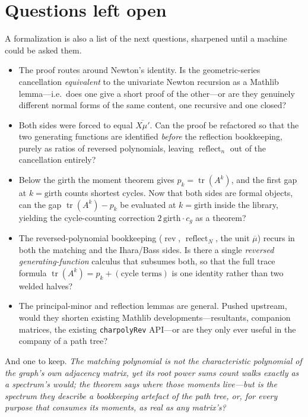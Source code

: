\documentclass[11pt]{article}
\newcommand{\lean}[1]{{\def\_{\textunderscore\allowbreak}\texttt{#1}}}
\DeclareMathOperator{\tr}{tr}
\DeclareMathOperator{\reflect}{reflect}
\DeclareMathOperator{\rev}{rev}
\begin{document}
\section{Questions left open}
\label{sec:questions}

A formalization is also a list of the next questions, sharpened until a machine could be asked them.

\begin{itemize}
\item The proof routes around Newton's identity. Is the geometric-series cancellation
\emph{equivalent} to the univariate Newton recursion as a Mathlib lemma---i.e.\ does one give a
short proof of the other---or are they genuinely different normal forms of the same content, one
recursive and one closed?
\item Both sides were forced to equal $\overline{X\mu'}$. Can the proof be refactored so that the two
generating functions are identified \emph{before} the reflection bookkeeping, purely as ratios of
reversed polynomials, leaving $\reflect_n$ out of the cancellation entirely?
\item Below the girth the moment theorem gives $p_k=\tr(A^k)$, and the first gap at $k=\mathrm{girth}$
counts shortest cycles. Now that both sides are formal objects, can the gap
$\tr(A^k)-p_k$ be evaluated at $k=\mathrm{girth}$ inside the library, yielding the cycle-counting
correction $2\,\mathrm{girth}\cdot c_g$ as a theorem?
\item The reversed-polynomial bookkeeping ($\rev$, $\reflect_N$, the unit $\overline{\mu}$) recurs in
both the matching and the Ihara/Bass sides. Is there a single \emph{reversed generating-function}
calculus that subsumes both, so that the full trace formula $\tr(A^k)=p_k+(\text{cycle terms})$ is one
identity rather than two welded halves?
\item The principal-minor and reflection lemmas are general. Pushed upstream, would they shorten
existing Mathlib developments---resultants, companion matrices, the existing \lean{charpolyRev}
API---or are they only ever useful in the company of a path tree?
\end{itemize}

And one to keep. \emph{The matching polynomial is not the characteristic polynomial of the graph's own
adjacency matrix, yet its root power sums count walks exactly as a spectrum's would; the theorem says where those moments live---but
is the spectrum they describe a bookkeeping artefact of the path tree, or, for every purpose that
consumes its moments, as real as any matrix's?}
\end{document}
